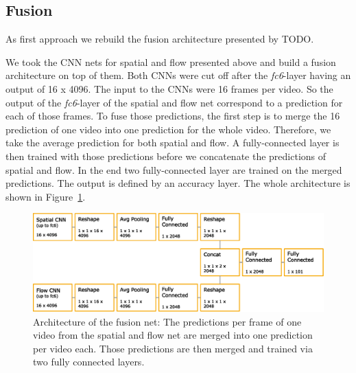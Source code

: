\subsection{Fusion}
As first approach we rebuild the fusion architecture presented by TODO.

We took the CNN nets for spatial and flow presented above and build a fusion architecture on top of them.
Both CNNs were cut off after the \textit{fc6}-layer having an output of 16 x 4096.
The input to the CNNs were 16 frames per video.
So the output of the \textit{fc6}-layer of the spatial and flow net correspond to a prediction for each of those frames.
To fuse those predictions, the first step is to merge the 16 prediction of one video into one prediction for the whole video.
Therefore, we take the average prediction for both spatial and flow.
A fully-connected layer is then trained with those predictions before we concatenate the predictions of spatial and flow.
In the end two fully-connected layer are trained on the merged predictions.
The output is defined by an accuracy layer.
The whole architecture is shown in Figure~\ref{fig:fusion_architecture}.
\begin{figure}[!htb]
	\centering
	\includegraphics[scale=.7]{images/fusion_architecture.eps}
	\caption{Architecture of the fusion net: The predictions per frame of one video from the spatial and flow net are merged into one prediction per video each. Those predictions are then merged and trained via two fully connected layers.}
	\label{fig:fusion_architecture}
\end{figure}






